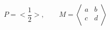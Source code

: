 \[  P = \biggl< \frac12 \biggr>, \qquad
M = \left< \begin{matrix}
  a & b \\ c & d \\
\end{matrix}\right>  \]
